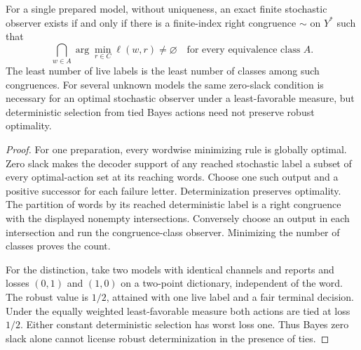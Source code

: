 \begin{proposition}\label{prop:boundary-ties}
For a single prepared model, without uniqueness, an exact finite stochastic observer exists if and only if there is a finite-index right congruence $\sim$ on $Y^*$ such that
\[
 \bigcap_{w\in A}\arg\min_{r\in C}\ell(w,r)\ne\varnothing
             \quad\text{for every equivalence class }A.
\]
The least number of live labels is the least number of classes among such congruences. For several unknown models the same zero-slack condition is necessary for an optimal stochastic observer under a least-favorable measure, but deterministic selection from tied Bayes actions need not preserve robust optimality.
\end{proposition}
\begin{proof}
For one preparation, every wordwise minimizing rule is globally optimal. Zero slack makes the decoder support of any reached stochastic label a subset of every optimal-action set at its reaching words. Choose one such output and a positive successor for each failure letter. Determinization preserves optimality. The partition of words by its reached deterministic label is a right congruence with the displayed nonempty intersections. Conversely choose an output in each intersection and run the congruence-class observer. Minimizing the number of classes proves the count.

For the distinction, take two models with identical channels and reports and losses $(0,1)$ and $(1,0)$ on a two-point dictionary, independent of the word. The robust value is $1/2$, attained with one live label and a fair terminal decision. Under the equally weighted least-favorable measure both actions are tied at loss $1/2$. Either constant deterministic selection has worst loss one. Thus Bayes zero slack alone cannot license robust determinization in the presence of ties.
\end{proof}

